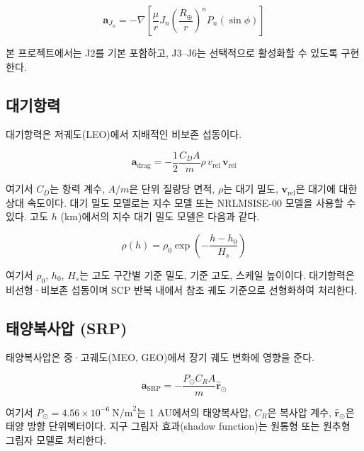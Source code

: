 \documentclass[11pt]{article}
\begin{document}
\begin{equation}
  \mathbf{a}_{J_n} = -\nabla\!\left[\frac{\mu}{r} J_n \left(\frac{R_\oplus}{r}\right)^n P_n(\sin\phi)\right]
  \label{eq:Jn_general}
\end{equation}

본 프로젝트에서는 J2를 기본 포함하고, J3--J6는 선택적으로 활성화할 수 있도록 구현한다.

\subsection{대기항력}

대기항력은 저궤도(LEO)에서 지배적인 비보존 섭동이다.

\begin{equation}
  \mathbf{a}_\mathrm{drag} = -\frac{1}{2}\frac{C_D A}{m}\rho\, v_\mathrm{rel}\, \mathbf{v}_\mathrm{rel}
  \label{eq:drag}
\end{equation}

여기서 $C_D$는 항력 계수, $A/m$은 단위 질량당 면적, $\rho$는 대기 밀도,
$\mathbf{v}_\mathrm{rel}$은 대기에 대한 상대 속도이다.
대기 밀도 모델로는 지수 모델 또는 NRLMSISE-00 모델을 사용할 수 있다.
고도 $h$ (km)에서의 지수 대기 밀도 모델은 다음과 같다.

\begin{equation}
  \rho(h) = \rho_0 \exp\!\left(-\frac{h - h_0}{H_s}\right)
  \label{eq:atm_density}
\end{equation}

여기서 $\rho_0$, $h_0$, $H_s$는 고도 구간별 기준 밀도, 기준 고도, 스케일 높이이다.
대기항력은 비선형·비보존 섭동이며 SCP 반복 내에서 참조 궤도 기준으로 선형화하여 처리한다.

\subsection{태양복사압 (SRP)}

태양복사압은 중·고궤도(MEO, GEO)에서 장기 궤도 변화에 영향을 준다.

\begin{equation}
  \mathbf{a}_\mathrm{SRP} = -\frac{P_\odot C_R A}{m}\hat{\mathbf{r}}_{\odot}
  \label{eq:SRP}
\end{equation}

여기서 $P_\odot = 4.56 \times 10^{-6}\ \mathrm{N/m}^2$는 1 AU에서의 태양복사압,
$C_R$은 복사압 계수, $\hat{\mathbf{r}}_{\odot}$은 태양 방향 단위벡터이다.
지구 그림자 효과(shadow function)는 원통형 또는 원추형 그림자 모델로 처리한다.
\end{document}
